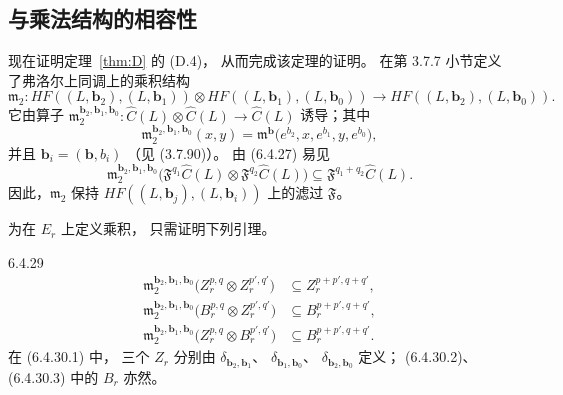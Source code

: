 
\subsection{与乘法结构的相容性}
\label{subsec:6-4-5}

现在证明定理~\ref{thm:D} 的 \textup{(D.4)}，
从而完成该定理的证明。
在第 3.7.7 小节定义了弗洛尔上同调上的乘积结构
\[
\mathfrak m_2:
HF((L,\mathbf b_2),(L,\mathbf b_1))
\otimes HF((L,\mathbf b_1),(L,\mathbf b_0))
\longrightarrow HF((L,\mathbf b_2),(L,\mathbf b_0)).
\]
它由算子
$\mathfrak m_2^{\mathbf b_2,\mathbf b_1,\mathbf b_0}
:\widehat C(L)\otimes\widehat C(L)\to\widehat C(L)$
诱导；其中
\begin{equation}
\mathfrak m_2^{\mathbf b_2,\mathbf b_1,\mathbf b_0}(x,y)
=\mathfrak m^{\boldsymbol b}
\bigl(e^{b_2},x,e^{b_1},y,e^{b_0}\bigr),
\tag{6.4.27}\label{eq:6-4-27}
\end{equation}
并且
$\mathbf b_i=(\boldsymbol b,b_i)$
（见 (3.7.90)）。
由 (6.4.27) 易见
\begin{equation}
\mathfrak m_2^{\mathbf b_2,\mathbf b_1,\mathbf b_0}
\bigl(\mathfrak F^{q_1}\widehat C(L)
\otimes\mathfrak F^{q_2}\widehat C(L)\bigr)
\subseteq\mathfrak F^{q_1+q_2}\widehat C(L).
\tag{6.4.28}\label{eq:6-4-28}
\end{equation}
因此，$\mathfrak m_2$
保持 $HF((L,\mathbf b_j),(L,\mathbf b_i))$
上的滤过 $\mathfrak F$。

为在 $E_r$ 上定义乘积，
只需证明下列引理。

\begin{lemma}{6.4.29}\label{lem:6-4-29}
\begin{align}
\mathfrak m_2^{\mathbf b_2,\mathbf b_1,\mathbf b_0}
\bigl(Z_r^{p,q}\otimes Z_r^{p',q'}\bigr)
&\subseteq Z_r^{p+p',q+q'},
\tag{6.4.30.1}\label{eq:6-4-30-1}\\
\mathfrak m_2^{\mathbf b_2,\mathbf b_1,\mathbf b_0}
\bigl(B_r^{p,q}\otimes Z_r^{p',q'}\bigr)
&\subseteq B_r^{p+p',q+q'},
\tag{6.4.30.2}\label{eq:6-4-30-2}\\
\mathfrak m_2^{\mathbf b_2,\mathbf b_1,\mathbf b_0}
\bigl(Z_r^{p,q}\otimes B_r^{p',q'}\bigr)
&\subseteq B_r^{p+p',q+q'}.
\tag{6.4.30.3}\label{eq:6-4-30-3}
\end{align}
在 (6.4.30.1) 中，
三个 $Z_r$ 分别由
$\delta_{\mathbf b_2,\mathbf b_1}$、
$\delta_{\mathbf b_1,\mathbf b_0}$、
$\delta_{\mathbf b_2,\mathbf b_0}$ 定义；
(6.4.30.2)、(6.4.30.3)
中的 $B_r$ 亦然。
\end{lemma}

